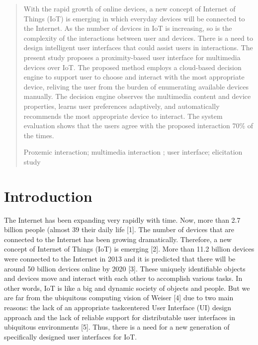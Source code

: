 \documentclass[runningheads,a4paper]{llncs}
\newcommand{\keywords}[1]{\par\addvspace\baselineskip
\noindent\keywordname\enspace\ignorespaces#1}
\providecommand{\DIFadd}[1]{{\protect\color{blue}\uwave{#1}}} %
\providecommand{\DIFaddbegin}{} %
\providecommand{\DIFaddend}{} %
\newcommand{\DIFaddincludegraphics}[2][]{{\color{blue}\fbox{\DIFOincludegraphics[#1]{#2}}}} %
\DeclareRobustCommand{\DIFaddbegin}{\DIFOaddbegin \let\includegraphics\DIFaddincludegraphics} %
\DeclareRobustCommand{\DIFaddend}{\DIFOaddend \let\includegraphics\DIFOincludegraphics} %
\begin{document}
\begin{abstract}
With the rapid growth of online devices, a new concept of
Internet of Things (IoT) is emerging in which everyday devices will be connected to the Internet. As the number of devices in IoT is increasing, so is the complexity of the interactions between user and devices. There is a need to design intelligent user interfaces that could assist users in interactions. The present study proposes a proximity-based user interface for multimedia devices over IoT. The proposed method employs a cloud-based decision engine to support user to choose and interact with the most appropriate device, reliving the user from the burden of enumerating available devices manually. The decision engine observes the multimedia content and device properties, learns user preferences adaptively, and automatically recommends the most appropriate device to interact. The system evaluation shows that the users agree with the proposed interaction 70\% of the times.
\DIFaddbegin 

\DIFadd{EXAMPLE SENTENCE I ADDED
}\DIFaddend \keywords{Proxemic interaction; multimedia interaction ; user interface; elicitation study}
\end{abstract}


\section{Introduction}

The Internet has been expanding very rapidly with time. Now, more than 2.7
billion people (almost 39%
their daily life [1]. The number of devices that are connected to the Internet has
been growing dramatically. Therefore, a new concept of Internet of Things (IoT)
is emerging [2]. More than 11.2 billion devices were connected to the Internet in
2013 and it is predicted that there will be around 50 billion devices online by 2020
[3]. These uniquely identifiable objects and devices move and interact with each
other to accomplish various tasks. In other words, IoT is like a big and dynamic
society of objects and people. But we are far from the ubiquitous computing
vision of Weiser [4] due to two main reasons: the lack of an appropriate taskcentered User Interface (UI) design approach and the lack of reliable support
for distributable user interfaces in ubiquitous environments [5]. Thus, there is a
need for a new generation of specifically designed user interfaces for IoT.
\end{document}
